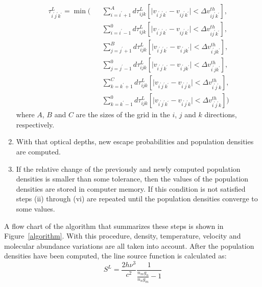 \documentclass{mn2e}
\begin{document}
\begin{enumerate}
{\begin{eqnarray}\label{tau_poprat}
\tau_{i^\prime j^\prime k^\prime}^L= \min\Big(&& \sum\limits_{i=i^\prime+1}^Ad\tau_{ijk}^L[\mid v_{i^\prime j^\prime k^\prime}-v_{ij^\prime k^\prime}\mid<\Delta v_{ij^\prime k^\prime}^{th}], \\ \nonumber
&& \sum\limits_{i=i^\prime-1}^0d\tau_{ijk}^L[\mid v_{i^\prime j^\prime k^\prime}-v_{ij^\prime k^\prime}\mid<\Delta v_{ij^\prime k^\prime}^{th}],\\ \nonumber 
&& \sum\limits_{j=j^\prime+1}^Bd\tau_{ijk}^L[\mid v_{i^\prime j^\prime k^\prime}-v_{i^\prime jk^\prime}\mid<\Delta v_{i^\prime jk^\prime}^{th}],\\ \nonumber 
&& \sum\limits_{j=j^\prime-1}^0d\tau_{ijk}^L[\mid v_{i^\prime j^\prime k^\prime}-v_{i^\prime jk^\prime}\mid<\Delta v_{i^\prime jk^\prime}^{th}],\\ \nonumber 
&& \sum\limits_{k=k^\prime+1}^Cd\tau_{ijk}^L[\mid v_{i^\prime j^\prime k^\prime}-v_{i^\prime j^\prime k}\mid<\Delta v_{i^\prime j^\prime k}^{th}],\\ \nonumber 
&& \sum\limits_{k=k^\prime-1}^0d\tau_{ijk}^L[\mid v_{i^\prime j^\prime k^\prime}-v_{i^\prime j^\prime k}\mid<\Delta v_{i^\prime j^\prime k}^{th}]\nonumber \Big)
\end{eqnarray}
where $A$, $B$ and $C$ are the sizes of the grid in the $i$, $j$ and $k$ directions, respectively.}\\
\item{With that optical depths, new escape probabilities and population densities are computed.}\\
\item{If the relative change of the previously and newly computed population densities is smaller than some tolerance, then the values of the population densities are stored in computer memory. If this condition is not satisfied steps (ii) through (vi) are repeated until the population densities converge to some values.} 
\end{enumerate}

A flow chart of the algorithm that summarizes these steps is shown in Figure~\ref{algorithm}. With this procedure, density, temperature, velocity and molecular abundance variations are all taken into account. After the population densities have been computed, the line source function is calculated as:
\begin{equation}
S^L=\frac{2h\nu^3}{c^2}\frac{1}{\frac{n_mg_n}{n_ng_m}-1}
\end{equation}
\end{document}
